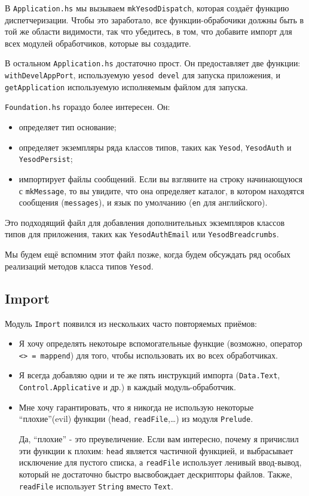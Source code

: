 В \lstinline!Application.hs! мы вызываем \lstinline!mkYesodDispatch!, которая создаёт функцию диспетчеризации.
Чтобы это заработало, все функции-обрабочики должны быть в той же области видимости, так что убедитесь, в
том, что добавите импорт для всех модулей обработчиков, которые вы создадите.

В остальном \lstinline!Application.hs! достаточно прост. Он предоставляет две функции:
\lstinline!withDevelAppPort!, используемую \lstinline!yesod devel! для запуска приложения,
и \lstinline!getApplication! используемую исполняемым файлом для запуска.

\lstinline!Foundation.hs! гораздо более интересен. Он:
\begin{itemize}
  \item определяет тип основание;
  \item определяет экземпляры ряда классов типов, таких как \lstinline!Yesod!, \lstinline!YesodAuth! и \lstinline!YesodPersist!;
  \item импортирует файлы сообщений. Если вы взгляните на строку начинающуюся с \lstinline!mkMessage!,
    то вы увидите, что она определяет каталог, в котором находятся сообщения (\lstinline!messages!),
    и язык по умолчанию (\lstinline!en! для английского).
\end{itemize}

Это подходящий файл для добавления дополнительных экземпляров классов типов для приложения,
таких как \lstinline!YesodAuthEmail! или \lstinline!YesodBreadcrumbs!.

Мы будем ещё вспомним этот файл позже, когда будем обсуждать ряд особых реализаций
методов класса типов \lstinline!Yesod!.

\subsection{Import}

Модуль \lstinline!Import! появился из нескольких часто повторяемых приёмов:

\begin{itemize}
  \item Я хочу определять некотоыре вспомогательные функцие (возможно, оператор \lstinline!<> = mappend!)
для того, чтобы использовать их во всех обработчиках.
  \item Я всегда добавляю одни и те же пять инструкций импорта  (\lstinline!Data.Text!, \lstinline!Control.Applicative! и др.) в каждый модуль-обработчик.
  \item Мне хочу гарантировать, что я никогда не использую некоторые ``плохие''(evil) функции (\lstinline!head!,
\lstinline!readFile!,\ldots) из модуля \lstinline!Prelude!.
    \begin{remark}
      Да, ``плохие'' - это преувеличение. Если вам интересно, почему я причислил эти функции к плохим:
      \lstinline!head! является частичной функцией, и выбрасывает исключение для пустого списка,
      а \lstinline!readFile! использует ленивый ввод-вывод, который не достаточно быстро
      высвобождает дескрипторы файлов. Также, \lstinline!readFile! использует \lstinline!String! вместо
      \lstinline!Text!.
    \end{remark}
\end{itemize}

